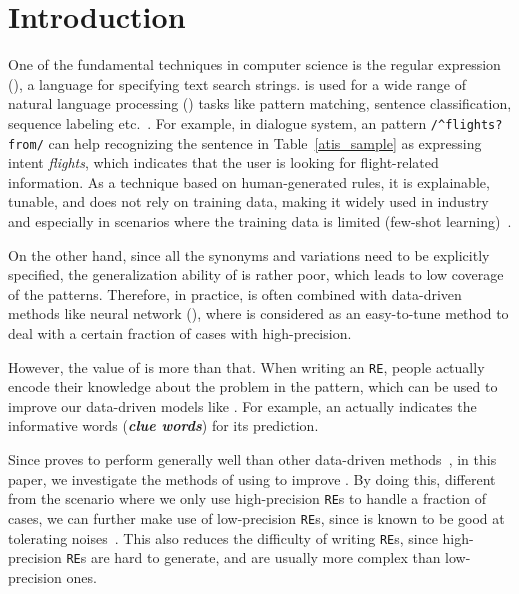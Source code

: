 \section{Introduction}


One of the fundamental techniques in computer science is the regular expression (\RE), a language for specifying text search strings.  \RE
is used for a wide range of natural language processing (\NLP) tasks like pattern matching, sentence classification, sequence labeling
etc.~\cite{chang2014tokensregex}. For example, in dialogue system, an \RE pattern \texttt{/\textasciicircum flights? from/} can help
recognizing the sentence in Table~\ref{atis_sample} as expressing intent \emph{flights}, which indicates that the user is looking for
flight-related information. As a technique based on human-generated rules, it is explainable, tunable, and does not rely on training data,
making it widely used in industry and especially in scenarios where the training data is limited (few-shot learning)~\cite{gc2015big}.

On the other hand, since all the synonyms and variations need to be explicitly specified, the generalization ability of \RE is rather poor,
which leads to low coverage of the patterns. Therefore, in practice, \RE is often combined with data-driven methods like neural network
(\NN), where \RE is considered as an easy-to-tune method to deal with a certain fraction of cases with high-precision.

However, the value of \RE is more than that. When writing an \texttt{RE}, people actually encode their knowledge about the problem in the
pattern, which can be used to improve our data-driven models like \NN. For example, an \RE actually indicates the informative words
(\textbf{\emph{clue words}}) for its prediction.

Since \NN proves to perform generally well than other data-driven methods~\cite{kim2014convolutional, bahdanau2014neural}, in this paper,
we investigate the methods of using \RE to improve \NN. By doing this, different from the scenario where we only use high-precision
\texttt{RE}s to handle a fraction of cases, we can further make use of low-precision \texttt{RE}s, since \NN is known to be good at
tolerating noises~\cite{xie2016disturblabel}. This also reduces the difficulty of writing \texttt{RE}s, since high-precision \texttt{RE}s
are hard to generate, and are usually more complex than low-precision ones.


